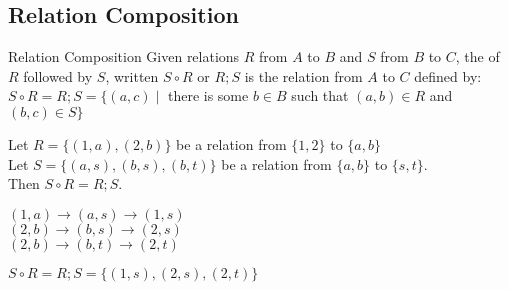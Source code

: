 \documentclass[\main/notes.tex]{subfiles}
\begin{document}
			\subsection{Relation Composition}
				\begin{definition}{Relation Composition}
					Given relations $R$ from $A$ to $B$ and $S$ from $B$ to $C$, the  of $R$ followed by $S$, written $S \circ R$ or $R;S$ is the relation from $A$ to $C$ defined by:\\
					$S \circ R = R;S = \bigl\{(a, c) \mid$ there is some $b \in B$ such that $(a, b) \in R$ and $(b, c) \in S\bigr\}$
				\end{definition}
				\begin{example}[width=0.72\textwidth]
					Let $R = \bigl\{(1, a), (2, b)\bigr\}$ be a relation from $\{1, 2\}$ to $\{a, b\}$\\
					Let $S = \bigl\{(a, s), (b, s), (b, t)\bigr\}$ be a relation from $\{a, b\}$ to $\{s, t\}$.\\
					Then $S \circ R = R;S$.
					\begin{indentparagraph}
						$(1, a) \rightarrow (a, s) \rightarrow (1, s)$\\
						$(2, b) \rightarrow (b, s) \rightarrow (2, s)$\\
						$(2, b) \rightarrow (b, t) \rightarrow (2, t)$
					\end{indentparagraph}
					$S \circ R = R;S = \bigl\{(1, s), (2, s), (2, t)\bigr\}$
				\end{example}
				\pagebreak
\end{document}

